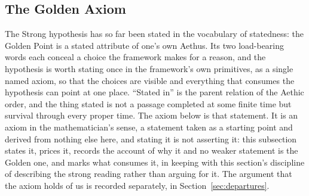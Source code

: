 \subsection{The Golden Axiom}\label{gc:sub:goldenaxiom}

The Strong hypothesis has so far been stated in the vocabulary of
statedness: the Golden Point is a stated attribute of one's own Aethus.
Its two load-bearing words each conceal a choice the framework makes for
a reason, and the hypothesis is worth stating once in the framework's
own primitives, as a single named axiom, so that the choices are visible
and everything that consumes the hypothesis can point at one place.
``Stated in'' is the parent relation of the Aethic order, and the thing
stated is not a passage completed at some finite time but survival
through every proper time. The axiom below is that statement. It is an
axiom in the mathematician's sense, a statement taken as a starting point
and derived from nothing else here, and stating it is not asserting it:
this subsection states it, prices it, records the account of
why it and no weaker statement is the Golden one, and marks what
consumes it, in keeping with this section's discipline of describing the
strong reading rather than arguing for it. The argument that the
axiom holds of us is recorded separately, in
Section~\ref{sec:departures}.


